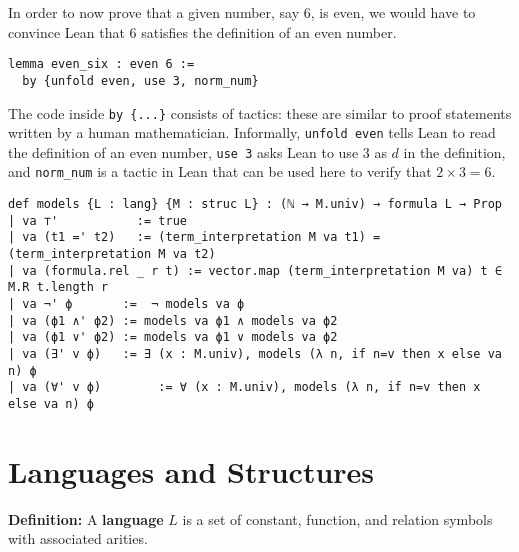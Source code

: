 \documentclass[landscape]{sciposter}
\begin{document}
\begin{multicols}{3}
In order to now prove that a given number, say \(6\), is even, we would have to convince Lean that \(6\) satisfies the definition of an even number.
\vspace{4mm}
\begin{lstlisting}
lemma even_six : even 6 :=
  by {unfold even, use 3, norm_num}
\end{lstlisting}

The code inside \texttt{by \{...\}} consists of tactics: these are similar to proof statements written by a human mathematician. Informally, \texttt{unfold even} tells Lean to read the definition of an even number, \texttt{use 3} asks Lean to use \(3\) as \(d\) in the definition, and \texttt{norm\_num} is a tactic in Lean that can be used here to verify that \(2\times3 = 6\).

\begin{lstlisting}
def models {L : lang} {M : struc L} : (ℕ → M.univ) → formula L → Prop
| va ⊤'           := true
| va (t1 =' t2)   := (term_interpretation M va t1) = (term_interpretation M va t2)
| va (formula.rel _ r t) := vector.map (term_interpretation M va) t ∈ M.R t.length r
| va ¬' ϕ       :=  ¬ models va ϕ
| va (ϕ1 ∧' ϕ2) := models va ϕ1 ∧ models va ϕ2
| va (ϕ1 ∨' ϕ2) := models va ϕ1 ∨ models va ϕ2
| va (∃' v ϕ)   := ∃ (x : M.univ), models (λ n, if n=v then x else va n) ϕ
| va (∀' v ϕ)        := ∀ (x : M.univ), models (λ n, if n=v then x else va n) ϕ
\end{lstlisting}


\section*{Languages and Structures}

\textbf{Definition:} A \textbf{language} $L$ is a set of constant, function, and relation symbols with associated arities.



\end{multicols}
\end{document}
